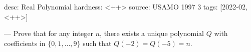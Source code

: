 desc: Real Polynomial
hardness: <++>
source: USAMO 1997 3
tags: [2022-02, <++>]

---
Prove that for any integer $n$, there exists a unique polynomial $Q$ with coefficients in $\{0,1,\ldots,9\}$ such that $Q(-2) = Q(-5) = n$.
